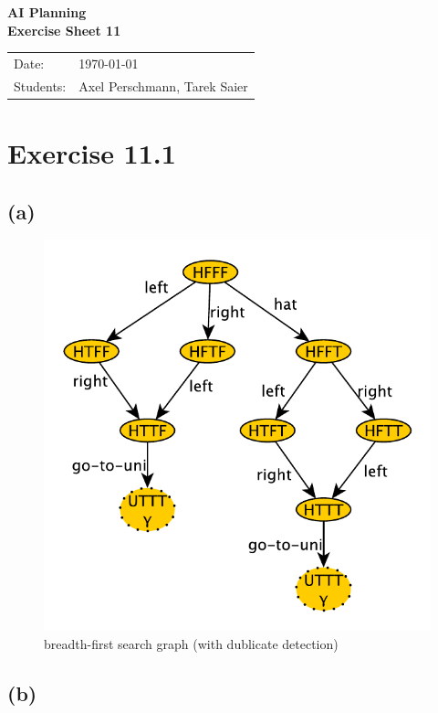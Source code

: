 \documentclass[11pt,a4paper]{article}
\newcommand{\sheetNr}{11}
\begin{document}
\begin{center}
\Huge{\textbf{AI Planning}}\\
\LARGE{\textbf{Exercise Sheet \sheetNr}}
\end{center}
\vspace{2cm}
\begin{tabular}{ll}
Date: & \today\\
Students: & Axel Perschmann, Tarek Saier
\end{tabular}

\section*{Exercise 11.1}
\subsection*{(a)}
\begin{figure}[h!]
\centering
\includegraphics[scale=0.7]{breadthFirstBasic}
\caption{breadth-first search graph (with dublicate detection)}
\end{figure}

\subsection*{(b)}
\end{document}
